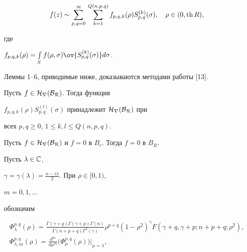 $$ 


f(z)\sim\sum^\infty_{p,q=0}\, 


\sum^{Q(n,p,q)}_{k=1}f_{p,q,k}(\rho)S^{(k)}_{p,q}(\sigma), 


\quad \rho\in(0,\th R), 


$$ 


где 


$f_{p,q,k}(\rho)=\int\limits_{S}f(\rho,\sigma)


\ov{S^{(k)}_{p,q}(\sigma)}d\sigma$. 


 


Леммы 1--6, приводимые ниже, доказываются методами работы [13]. 


 


\begin{lem} 


Пусть $f\in\cal H_r(B_R)$. Тогда функция 


$f_{p,q,k}(\rho)S^{(l)}_{p,q}(\sigma)$ принадлежит $\cal H_r(B_R)$ при 


всех $p,q\ge0$, $1\le k,l\le Q(n,p,q)$. 


\end{lem} 


 


\begin{lem} 


Пусть $f\in\cal H_r(B_R)$ и $f=0$ в $B_r$. Тогда $f=0$ в $B_R$. 


\end{lem} 


 


Пусть $\lambda\in\Bbb C$, 


$\gamma=\gamma(\lambda)=\frac{n-i\lambda}{2}$. При $\rho\in[0,1)$, 


$m=0,1,\dotsc$ 


обозначим 


\begin{gather*} 


\Phi^{p,q}_\lambda(\rho)= 


\frac{\Gamma(\gamma+q)\Gamma(\gamma+p)\Gamma(n)} 


{\Gamma(n+p+q)\Gamma^2(\gamma)}\rho^{p+q} 


(1-\rho^2)^\gamma F(\gamma+q,\gamma+p;n+p+q;\rho^2),\\ 


% 


\Phi^{p,q}_{\lambda,m}(\rho)=\frac{d^m}{d\mu^m} 


\big(\Phi^{p,q}_\mu(\rho)\big)\bigg|_{\mu=\lambda}, 


\end{gather*} 


